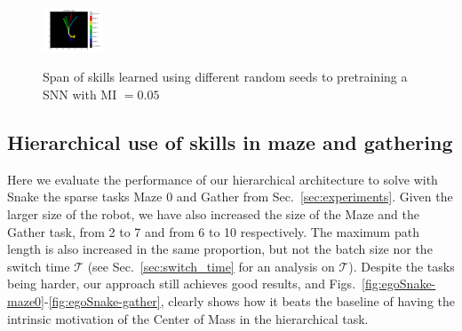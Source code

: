\documentclass{article} %
\begin{document}
\begin{figure}[h!]
{		\centering
		\label{fig:visit-snn-snake-50}
		\includegraphics[trim={2cm 0.7cm 5cm 1.5cm}, clip, width = 0.16\textwidth]{Figures/egoSnake64-snn_005MI_5grid_6lat_categorical_bil_0050_visitation.png}
	}
	\caption{Span of skills learned using different random seeds to pretraining a SNN with MI $= 0.05$}
	\label{fig:visitation-snn-egoSnake}
\end{figure}

\subsection{Hierarchical use of skills in maze and gathering}
\label{sec:snake-hierarchy}
Here we evaluate the performance of our hierarchical architecture to solve with Snake the sparse tasks Maze 0 and Gather from Sec.\ \ref{sec:experiments}. Given the larger size of the robot, we have also increased the size of the Maze and the Gather task, from 2 to 7 and from 6 to 10 respectively. The maximum path length is also increased in the same proportion, but not the batch size nor the switch time $\mathcal{T}$ (see Sec.\ \ref{sec:switch_time} for an analysis on $\mathcal{T}$). Despite the tasks being harder, our approach still achieves good results, and Figs.\ \ref{fig:egoSnake-maze0}-\ref{fig:egoSnake-gather}, clearly shows how it beats the baseline of having the intrinsic motivation of the Center of Mass in the hierarchical task.
\end{document}
